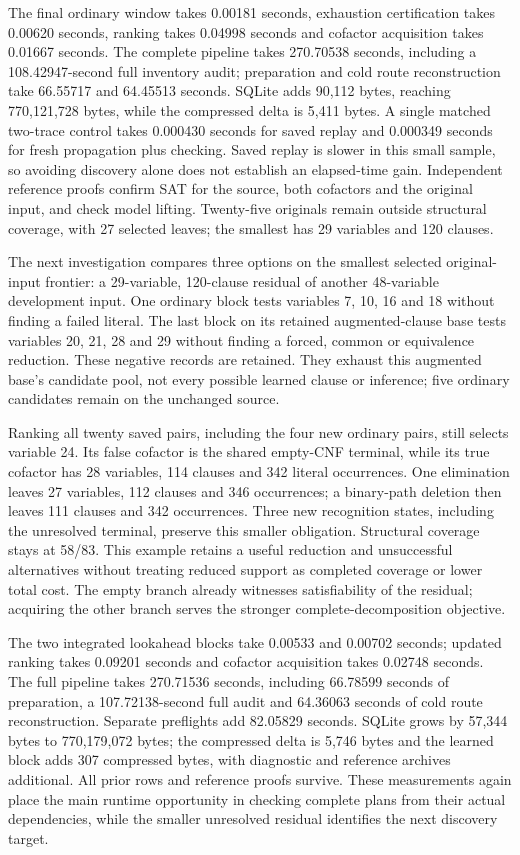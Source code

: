 \documentclass[11pt,a4paper]{article}
\numberwithin{equation}{section}
\theoremstyle{plain}
\theoremstyle{definition}
\theoremstyle{remark}
\begin{document}
The final ordinary window takes 0.00181 seconds, exhaustion certification takes 0.00620 seconds, ranking takes 0.04998 seconds and cofactor acquisition takes 0.01667 seconds. The complete pipeline takes 270.70538 seconds, including a 108.42947-second full inventory audit; preparation and cold route reconstruction take 66.55717 and 64.45513 seconds. SQLite adds 90,112 bytes, reaching 770,121,728 bytes, while the compressed delta is 5,411 bytes. A single matched two-trace control takes 0.000430 seconds for saved replay and 0.000349 seconds for fresh propagation plus checking. Saved replay is slower in this small sample, so avoiding discovery alone does not establish an elapsed-time gain. Independent reference proofs confirm SAT for the source, both cofactors and the original input, and check model lifting. Twenty-five originals remain outside structural coverage, with 27 selected leaves; the smallest has 29 variables and 120 clauses.

The next investigation compares three options on the smallest selected original-input frontier: a 29-variable, 120-clause residual of another 48-variable development input. One ordinary block tests variables 7, 10, 16 and 18 without finding a failed literal. The last block on its retained augmented-clause base tests variables 20, 21, 28 and 29 without finding a forced, common or equivalence reduction. These negative records are retained. They exhaust this augmented base's candidate pool, not every possible learned clause or inference; five ordinary candidates remain on the unchanged source.

Ranking all twenty saved pairs, including the four new ordinary pairs, still selects variable 24. Its false cofactor is the shared empty-CNF terminal, while its true cofactor has 28 variables, 114 clauses and 342 literal occurrences. One elimination leaves 27 variables, 112 clauses and 346 occurrences; a binary-path deletion then leaves 111 clauses and 342 occurrences. Three new recognition states, including the unresolved terminal, preserve this smaller obligation. Structural coverage stays at 58/83. This example retains a useful reduction and unsuccessful alternatives without treating reduced support as completed coverage or lower total cost. The empty branch already witnesses satisfiability of the residual; acquiring the other branch serves the stronger complete-decomposition objective.

The two integrated lookahead blocks take 0.00533 and 0.00702 seconds; updated ranking takes 0.09201 seconds and cofactor acquisition takes 0.02748 seconds. The full pipeline takes 270.71536 seconds, including 66.78599 seconds of preparation, a 107.72138-second full audit and 64.36063 seconds of cold route reconstruction. Separate preflights add 82.05829 seconds. SQLite grows by 57,344 bytes to 770,179,072 bytes; the compressed delta is 5,746 bytes and the learned block adds 307 compressed bytes, with diagnostic and reference archives additional. All prior rows and reference proofs survive. These measurements again place the main runtime opportunity in checking complete plans from their actual dependencies, while the smaller unresolved residual identifies the next discovery target.
\end{document}
